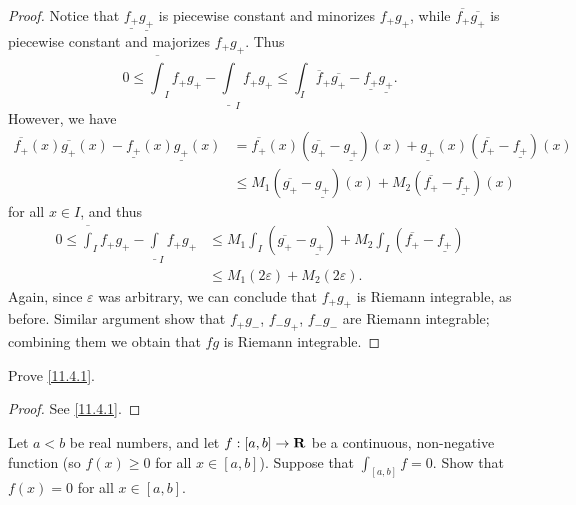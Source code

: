 \begin{proof}
  Notice that \(\underline{f_+} \underline{g_+}\) is piecewise constant and minorizes \(f_+ g_+\), while \(\overline{f_+} \overline{g_+}\) is piecewise constant and majorizes \(f_+ g_+\).
  Thus
  \[
    0 \leq \overline{\int}_I f_+ g_+ - \underline{\int}_I f_+ g_+ \leq \int_I \overline{f}_+ \overline{g_+} - \underline{f_+} \underline{g_+}.
  \]
  However, we have
  \begin{align*}
    \overline{f_+}(x) \overline{g_+}(x) - \underline{f_+}(x) \underline{g_+}(x) & = \overline{f_+}(x) (\overline{g_+} - \underline{g_+})(x) + \underline{g_+}(x) (\overline{f_+} - \underline{f_+})(x) \\
                                                                                & \leq M_1 (\overline{g_+} - \underline{g_+})(x) + M_2 (\overline{f_+} - \underline{f_+})(x)
  \end{align*}
  for all \(x \in I\), and thus
  \begin{align*}
    0 \leq \overline{\int}_I f_+ g_+ - \underline{\int}_I f_+ g_+ & \leq M_1 \int_I (\overline{g_+} - \underline{g_+}) + M_2 \int_I (\overline{f_+} - \underline{f_+}) \\
                                                                  & \leq M_1 (2\varepsilon) + M_2 (2\varepsilon).
  \end{align*}
  Again, since \(\varepsilon\) was arbitrary, we can conclude that \(f_+ g_+\) is Riemann integrable, as before.
  Similar argument show that \(f_+ g_-\), \(f_- g_+\), \(f_- g_-\) are Riemann integrable;
  combining them we obtain that \(fg\) is Riemann integrable.
\end{proof}

\exercisesection

\begin{exercise}\label{ex 11.4.1}
  Prove \cref{11.4.1}.
\end{exercise}

\begin{proof}
  See \cref{11.4.1}.
\end{proof}

\begin{exercise}\label{ex 11.4.2}
  Let \(a < b\) be real numbers, and let \(f : [a, b] \to \mathbf{R}\) be a continuous, non-negative function
  (so \(f(x) \geq 0\) for all \(x \in [a, b]\)).
  Suppose that \(\int_{[a, b]} f = 0\).
  Show that \(f(x) = 0\) for all \(x \in [a, b]\).
\end{exercise}

